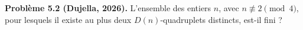 \textbf{Problème 5.2 (Dujella, 2026).} L'ensemble des entiers $n$, avec $n \not\equiv 2 \pmod 4$, pour lesquels il existe au plus deux $D(n)$-quadruplets distincts, est-il fini ?
